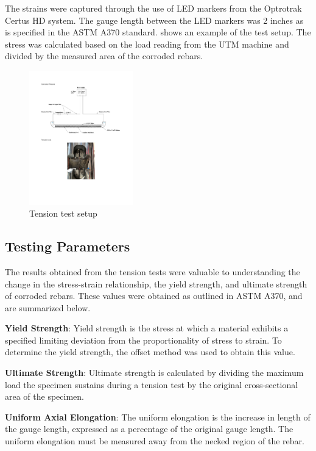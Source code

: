 The strains were captured through the use of LED markers from the Optrotrak Certus HD system. The gauge length between the LED markers was 2 inches as is specified in the ASTM A370 standard.  shows an example of the test setup. The stress was calculated based on the load reading from the UTM machine and divided by the measured area of the corroded rebars.

\begin{figure}[htbp]
	\centering
	\includegraphics[width=0.4\textwidth]{VAC Thesis 2.0/Chapter-3/figs/tension_test_utm.pdf}
	\caption{Tension test setup}
	\label{fig:TensionTest}
\end{figure}

\subsection{Testing Parameters}
The results obtained from the tension tests were valuable to understanding the change in the stress-strain relationship, the yield strength, and ultimate strength of corroded rebars. These values were obtained as outlined in ASTM A370, and are summarized below.

\textbf{Yield Strength}: Yield strength is the stress at which a material exhibits a specified limiting deviation from the proportionality of stress to strain. To determine the yield strength, the offset method was used to obtain this value.

\textbf{Ultimate Strength}: Ultimate strength is calculated by dividing the maximum load the specimen sustains during a tension test by the original cross-sectional area of the specimen.

\textbf{Uniform Axial Elongation}: The uniform elongation is the increase in length of the gauge length, expressed as a percentage of the original gauge length. The uniform elongation must be measured away from the necked region of the rebar.

